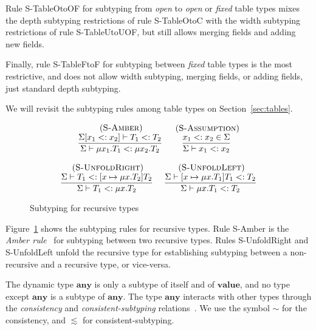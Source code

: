 \documentclass[preprint]{sigplanconf}
\newcommand{\Value}{\mathbf{value}}
\newcommand{\Any}{\mathbf{any}}
\newcommand{\mylabel}[1]{\; (\textsc{#1})}
\newcommand{\senv}{\Sigma}
\newcommand{\subtype}{<:}
\begin{document}
Rule {\sc S-TableOtoOF} for subtyping from {\em open} to {\em open} or {\em fixed} table types mixes the depth subtyping restrictions of rule {\sc S-TableOtoC} with the width subtyping restrictions of rule {\sc S-TableUtoUOF}, but still allows merging fields and adding new fields.

Finally, rule {\sc S-TableFtoF} for subtyping between {\em fixed} table types is the most restrictive, and does not allow width
subtyping, merging fields, or adding fields, just standard
depth subtyping.

We will revisit the subtyping rules among table types on
Section~\ref{sec:tables}.

\begin{figure}[t]
\label{fig:subrec}
\[
\begin{array}{c}
\begin{array}{c}
\mylabel{S-Amber}\\
\dfrac{\senv[x_{1} \subtype x_{2}] \vdash T_{1} \subtype T_{2}}
{\senv \vdash \mu x_{1}.T_{1} \subtype \mu x_{2}.T_{2}}
\end{array}
\;
\begin{array}{c}
\mylabel{S-Assumption}\\
\dfrac{x_{1} \subtype x_{2} \in \senv}
{\senv \vdash x_{1} \subtype x_{2}}
\end{array}\\\\
\begin{array}{c}
\mylabel{S-UnfoldRight}\\
\dfrac{\senv \vdash T_{1} \subtype [x \mapsto \mu x.T_{2}]T_{2}}
{\senv \vdash T_{1} \subtype \mu x.T_{2}}
\end{array}
\;
\begin{array}{c}
\mylabel{S-UnfoldLeft}\\
\dfrac{\senv \vdash [x \mapsto \mu x.T_{1}]T_{1} \subtype T_{2}}
{\senv \vdash \mu x.T_{1} \subtype T_{2}}
\end{array}
\end{array}
\]
\caption{Subtyping for recursive types}
\end{figure}

Figure~\ref{fig:subrec} shows the subtyping rules for
recursive types. Rule {\sc S-Amber} is the \emph{Amber rule}~\cite{cardelli1986amber} for subtyping between
two recursive types. Rules {\sc S-UnfoldRight} and {\sc S-UnfoldLeft} unfold the recursive type for establishing
subtyping between a non-recursive and a recursive type,
or vice-versa.

The dynamic type $\Any$ is only a subtype of itself and of
$\Value$, and no type except $\Any$ is a subtype of $\Any$.
The type $\Any$ interacts with other types through the
{\em consistency} and {\em consistent-subtyping} 
relations~\cite{siek2007objects}. We use the symbol $\sim$ for
the consistency, and $\lesssim$ for consistent-subtyping.
\end{document}
